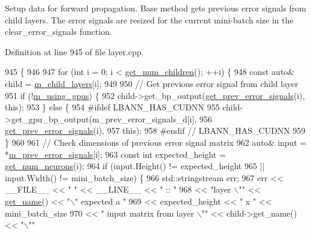 Setup data for forward propagation. Base method gets previous error signals from child layers. The error signals are resized for the current mini-\/batch size in the clear\+\_\+error\+\_\+signals function. 

Definition at line 945 of file layer.\+cpp.


\begin{DoxyCode}
945                                              \{
946 
947   \textcolor{keywordflow}{for} (\textcolor{keywordtype}{int} i = 0; i < \hyperlink{classlbann_1_1Layer_a1409a117c31a7ea4f2c7a4d22a3e86c3}{get\_num\_children}(); ++i) \{
948     \textcolor{keyword}{const} \textcolor{keyword}{auto}& child = \hyperlink{classlbann_1_1Layer_ae348c0d2b4d05f74d809d09debb633c0}{m\_child\_layers}[i];
949 
950     \textcolor{comment}{// Get previous error signal from child layer}
951     \textcolor{keywordflow}{if} (!\hyperlink{classlbann_1_1Layer_af7881cb5eff5207c15fa835d65462e8f}{m\_using\_gpus}) \{
952       child->get\_bp\_output(\hyperlink{classlbann_1_1Layer_a7ac4579d3c1671dfaf86e3b618d6938a}{get\_prev\_error\_signals}(i), \textcolor{keyword}{this});
953     \} \textcolor{keywordflow}{else} \{
954 \textcolor{preprocessor}{      #ifdef LBANN\_HAS\_CUDNN}
955       child->get\_gpu\_bp\_output(m\_prev\_error\_signals\_d[i],
956                                \hyperlink{classlbann_1_1Layer_a7ac4579d3c1671dfaf86e3b618d6938a}{get\_prev\_error\_signals}(i),
957                                \textcolor{keyword}{this});
958 \textcolor{preprocessor}{      #endif // LBANN\_HAS\_CUDNN}
959     \}
960 
961     \textcolor{comment}{// Check dimensions of previous error signal matrix}
962     \textcolor{keyword}{auto}& input = *\hyperlink{classlbann_1_1Layer_a6fdcbf884150d0b20cffe678fefd7caa}{m\_prev\_error\_signals}[i];
963     \textcolor{keyword}{const} \textcolor{keywordtype}{int} expected\_height = \hyperlink{classlbann_1_1Layer_aa4de686cc6c2dd38166f42faf874f227}{get\_num\_neurons}(i);
964     \textcolor{keywordflow}{if} (input.Height() != expected\_height
965         || input.Width() != mini\_batch\_size) \{
966       std::stringstream err;
967       err << \_\_FILE\_\_ << \textcolor{stringliteral}{" "} << \_\_LINE\_\_ << \textcolor{stringliteral}{" :: "}
968           << \textcolor{stringliteral}{"layer \(\backslash\)""} << \hyperlink{classlbann_1_1Layer_a80027550202fa7dbb1dd55fa8a66c84b}{get\_name}() << \textcolor{stringliteral}{"\(\backslash\)" expected a "}
969           << expected\_height << \textcolor{stringliteral}{" x "} << mini\_batch\_size
970           << \textcolor{stringliteral}{" input matrix from layer \(\backslash\)""} << child->get\_name() << \textcolor{stringliteral}{"\(\backslash\)""}

\end{DoxyCode}
